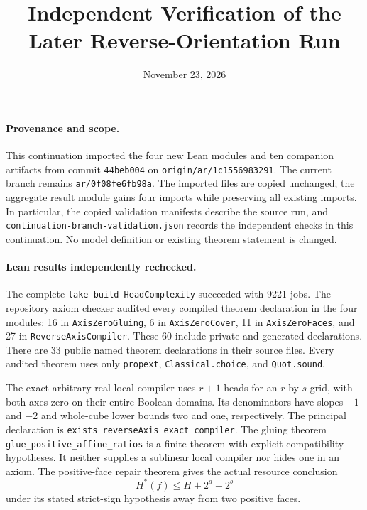 \documentclass[11pt]{article}
\title{Independent Verification of the Later Reverse-Orientation Run}
\author{}
\date{November 23, 2026}
\begin{document}
\maketitle

\paragraph{Provenance and scope.}
This continuation imported the four new Lean modules and ten companion
artifacts from commit \texttt{44beb004} on
\texttt{origin/ar/1c1556983291}. The current branch remains
\texttt{ar/0f08fe6fb98a}. The imported files are copied unchanged;
the aggregate result module gains four imports while preserving all
existing imports. In particular, the copied validation manifests describe
the source run, and \texttt{continuation-branch-validation.json} records
the independent checks in this continuation. No model definition or
existing theorem statement is changed.

\paragraph{Lean results independently rechecked.}
The complete \texttt{lake build HeadComplexity} succeeded with 9221 jobs.
The repository axiom checker audited every compiled theorem declaration
in the four modules: 16 in \texttt{AxisZeroGluing}, 6 in
\texttt{AxisZeroCover}, 11 in \texttt{AxisZeroFaces}, and 27 in
\texttt{ReverseAxisCompiler}. These 60 include private and generated
declarations. There are 33 public named theorem declarations in their
source files. Every audited theorem uses only \texttt{propext},
\texttt{Classical.choice}, and \texttt{Quot.sound}.

The exact arbitrary-real local compiler uses $r+1$ heads for an $r$ by
$s$ grid, with both axes zero on their entire Boolean domains. Its
denominators have slopes $-1$ and $-2$ and whole-cube lower bounds two
and one, respectively. The principal declaration is
\texttt{exists\_reverseAxis\_exact\_compiler}.
The gluing theorem \texttt{glue\_positive\_affine\_ratios} is a finite
theorem with explicit compatibility hypotheses. It neither supplies a
sublinear local compiler nor hides one in an axiom. The positive-face
repair theorem gives the actual resource conclusion
\[
 H^*(f)\leq H+2^a+2^b
\]
under its stated strict-sign hypothesis away from two positive faces.
\end{document}

